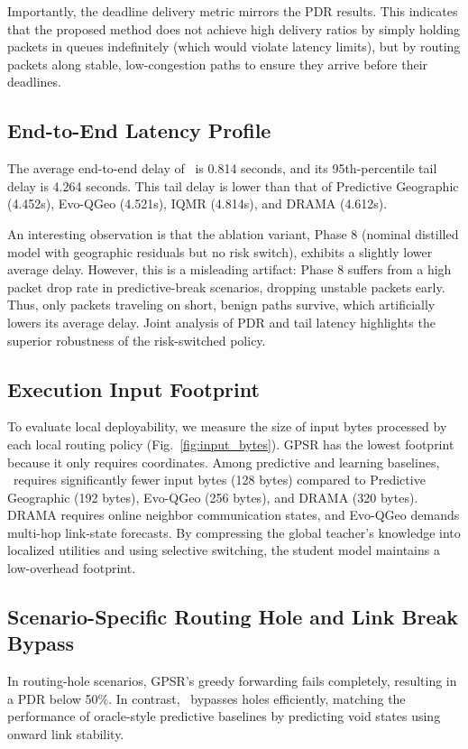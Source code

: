 Importantly, the deadline delivery metric mirrors the PDR results. This indicates that the proposed method does not achieve high delivery ratios by simply holding packets in queues indefinitely (which would violate latency limits), but by routing packets along stable, low-congestion paths to ensure they arrive before their deadlines.

\subsection{End-to-End Latency Profile}
The average end-to-end delay of \phaseTwelve\ is 0.814 seconds, and its 95th-percentile tail delay is 4.264 seconds. This tail delay is lower than that of Predictive Geographic (4.452s), Evo-QGeo (4.521s), IQMR (4.814s), and DRAMA (4.612s). 

An interesting observation is that the ablation variant, Phase 8 (nominal distilled model with geographic residuals but no risk switch), exhibits a slightly lower average delay. However, this is a misleading artifact: Phase 8 suffers from a high packet drop rate in predictive-break scenarios, dropping unstable packets early. Thus, only packets traveling on short, benign paths survive, which artificially lowers its average delay. Joint analysis of PDR and tail latency highlights the superior robustness of the risk-switched policy.

\subsection{Execution Input Footprint}
To evaluate local deployability, we measure the size of input bytes processed by each local routing policy (Fig.~\ref{fig:input_bytes}). GPSR has the lowest footprint because it only requires coordinates. Among predictive and learning baselines, \phaseTwelve\ requires significantly fewer input bytes (128 bytes) compared to Predictive Geographic (192 bytes), Evo-QGeo (256 bytes), and DRAMA (320 bytes). DRAMA requires online neighbor communication states, and Evo-QGeo demands multi-hop link-state forecasts. By compressing the global teacher's knowledge into localized utilities and using selective switching, the student model maintains a low-overhead footprint.

\subsection{Scenario-Specific Routing Hole and Link Break Bypass}
In routing-hole scenarios, GPSR's greedy forwarding fails completely, resulting in a PDR below 50\%. In contrast, \phaseTwelve\ bypasses holes efficiently, matching the performance of oracle-style predictive baselines by predicting void states using onward link stability.

